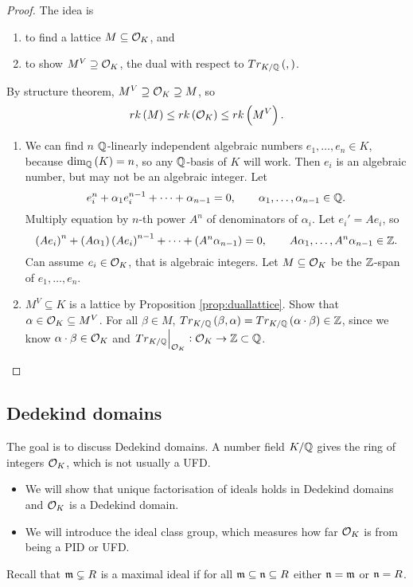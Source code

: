 \begin{proof}
The idea is
\begin{enumerate}
\item to find a lattice $ M \subseteq \mathcal{O}_K $, and
\item to show $ M^V \supseteq \mathcal{O}_K $, the dual with respect to $ Tr_{K / \Q}\br{,} $.
\end{enumerate}
By structure theorem, $ M^V \supseteq \mathcal{O}_K \supseteq M $, so
$$ rk\br{M} \le rk\br{\OO_K} \le rk\br{M^V}. $$
\begin{enumerate}
\item We can find $ n $ $ \mathbb{Q} $-linearly independent algebraic numbers $ e_1, \dots, e_n \in K $, because $ \dim_\Q\br{K} = n $, so any $ \mathbb{Q} $-basis of $ K $ will work. Then $ e_i $ is an algebraic number, but may not be an algebraic integer. Let
$$ e_i^n + \alpha_1e_i^{n - 1} + \dots + \alpha_{n - 1} = 0, \qquad \alpha_1, \dots, \alpha_{n - 1} \in \mathbb{Q}. $$
Multiply equation by $ n $-th power $ A^n $ of denominators of $ \alpha_i $. Let $ e_i' = Ae_i $, so
$$ \br{Ae_i}^n + \br{A\alpha_1}\br{Ae_i}^{n - 1} + \dots + \br{A^n\alpha_{n - 1}} = 0, \qquad A\alpha_1, \dots, A^n\alpha_{n - 1} \in \Z. $$
Can assume $ e_i \in \mathcal{O}_K $, that is algebraic integers. Let $ M \subseteq \mathcal{O}_K $ be the $ \mathbb{Z} $-span of $ e_1, \dots, e_n $.
\item $ M^V \subseteq K $ is a lattice by Proposition \ref{prop:duallattice}. Show that $ \alpha \in \mathcal{O}_K \subseteq M^V $. For all $ \beta \in M $, $ Tr_{K / \Q}\br{\beta, \alpha} = Tr_{K / \Q}\br{\alpha \cdot \beta} \in \Z $, since we know $ \alpha \cdot \beta \in \mathcal{O}_K $ and $ \left. Tr_{K / \mathbb{Q}} \right|_{\mathcal{O}_K} : \mathcal{O}_K \to \mathbb{Z} \subset \mathbb{Q} $.
\end{enumerate}
\end{proof}

\pagebreak

\subsection{Dedekind domains}


The goal is to discuss Dedekind domains. A number field $ K / \mathbb{Q} $ gives the ring of integers $ \mathcal{O}_K $, which is not usually a UFD.
\begin{itemize}
\item We will show that unique factorisation of ideals holds in Dedekind domains and $ \mathcal{O}_K $ is a Dedekind domain.
\item We will introduce the ideal class group, which measures how far $ \mathcal{O}_K $ is from being a PID or UFD.
\end{itemize}
Recall that $ \mathfrak{m} \subsetneq R $ is a maximal ideal if for all $ \mathfrak{m} \subseteq \mathfrak{n} \subseteq R $ either $ \mathfrak{n} = \mathfrak{m} $ or $ \mathfrak{n} = R $.

